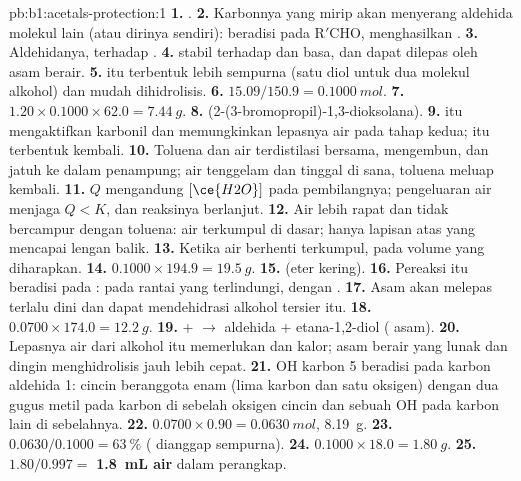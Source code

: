 \begin{solution}{pb:b1:acetals-protection:1}
\textbf{1.} .
\textbf{2.} Karbonnya yang mirip  akan menyerang aldehida molekul
lain (atau dirinya sendiri):  beradisi pada $\mathrm{R'CHO}$, menghasilkan .
\textbf{3.} Aldehidanya, terhadap .
\textbf{4.}  stabil terhadap  dan basa, dan dapat
dilepas oleh asam berair.
\textbf{5.}  itu terbentuk lebih sempurna (satu diol untuk dua
molekul alkohol) dan mudah dihidrolisis.
\textbf{6.} $15.09/150.9 = \qty{0.1000}{mol}$.
\textbf{7.} $1.20 \times 0.1000 \times 62.0 = \qty{7.44}{g}$.
\textbf{8.} 
(2-(3-bromopropil)-1,3-dioksolana).
\textbf{9.}  itu mengaktifkan karbonil dan memungkinkan lepasnya
air pada tahap kedua;  itu terbentuk kembali.
\textbf{10.} Toluena dan air terdistilasi bersama, mengembun, dan jatuh ke
dalam penampung; air tenggelam dan tinggal di sana, toluena meluap kembali.
\textbf{11.} $Q$ mengandung $[\ce{H2O}]$ pada pembilangnya; pengeluaran air menjaga
$Q < K$, dan reaksinya berlanjut.
\textbf{12.} Air lebih rapat dan tidak bercampur dengan toluena: air
terkumpul di dasar; hanya lapisan atas yang mencapai lengan balik.
\textbf{13.} Ketika air berhenti terkumpul, pada volume yang diharapkan.
\textbf{14.} $0.1000 \times 194.9 = \qty{19.5}{g}$.
\textbf{15.}  (eter kering).
\textbf{16.} Pereaksi itu beradisi pada : 
 pada rantai yang terlindungi, dengan .
\textbf{17.} Asam akan melepas  terlalu dini dan dapat
mendehidrasi alkohol tersier itu.
\textbf{18.} $0.0700 \times 174.0 = \qty{12.2}{g}$.
\textbf{19.}  +  $\to$ aldehida + etana-1,2-diol (
asam).
\textbf{20.} Lepasnya air dari alkohol itu memerlukan  dan kalor;
asam berair yang lunak dan dingin menghidrolisis  jauh lebih cepat.
\textbf{21.} OH karbon 5 beradisi pada karbon aldehida 1: cincin
beranggota enam (lima karbon dan satu oksigen) dengan dua gugus metil pada
karbon di sebelah oksigen cincin dan sebuah OH pada karbon lain di
sebelahnya.
\textbf{22.} $0.0700 \times 0.90 = \qty{0.0630}{mol}$, \qty{8.19}{g}.
\textbf{23.} $0.0630/0.1000 = \qty{63}{\percent}$ ( dianggap
sempurna).
\textbf{24.} $0.1000 \times 18.0 = \qty{1.80}{g}$.
\textbf{25.} $1.80/0.997 =$ \textbf{\qty{1.8}{mL} air} dalam perangkap.
\end{solution}

